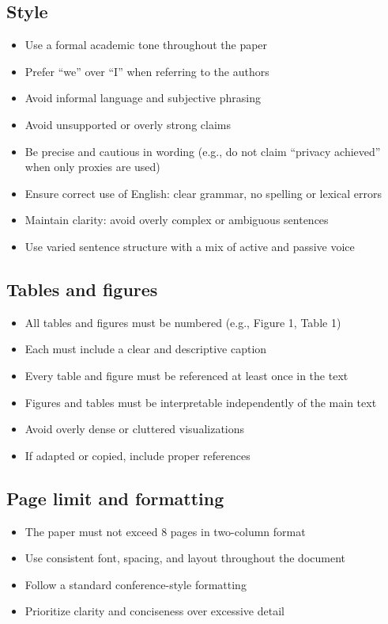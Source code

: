 \subsection{Style}
\begin{itemize}
  \item Use a formal academic tone throughout the paper
  \item Prefer ``we'' over ``I'' when referring to the authors
  \item Avoid informal language and subjective phrasing
  \item Avoid unsupported or overly strong claims
  \item Be precise and cautious in wording (e.g., do not claim ``privacy achieved'' when only proxies are used)
  \item Ensure correct use of English: clear grammar, no spelling or lexical errors
  \item Maintain clarity: avoid overly complex or ambiguous sentences
  \item Use varied sentence structure with a mix of active and passive voice
\end{itemize}

\subsection{Tables and figures}
\begin{itemize}
  \item All tables and figures must be numbered (e.g., Figure 1, Table 1)
  \item Each must include a clear and descriptive caption
  \item Every table and figure must be referenced at least once in the text
  \item Figures and tables must be interpretable independently of the main text
  \item Avoid overly dense or cluttered visualizations
  \item If adapted or copied, include proper references
\end{itemize}

\subsection{Page limit and formatting}
\begin{itemize}
  \item The paper must not exceed 8 pages in two-column format
  \item Use consistent font, spacing, and layout throughout the document
  \item Follow a standard conference-style formatting
  \item Prioritize clarity and conciseness over excessive detail
\end{itemize}

